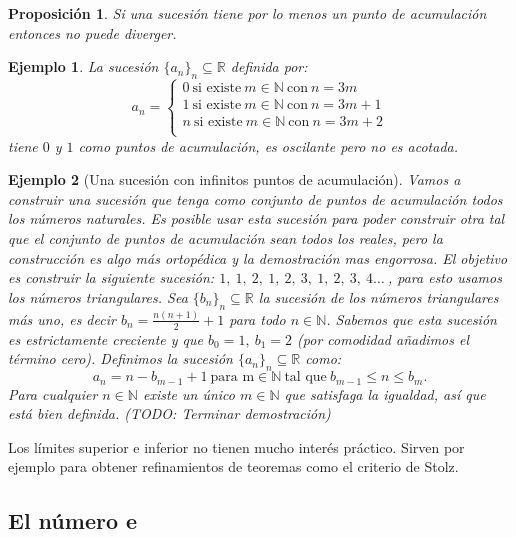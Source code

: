 \documentclass{article}
\newtheorem{prop}{Proposición}
\newtheorem{ejem}{Ejemplo}
\newcommand{\reales}{\mathbb{R}}
\newcommand{\naturales}{\mathbb{N}}
\newcommand{\sucreal}[1]{\{ #1 _n \}_n \subseteq \reales}
\begin{document}
\begin{prop}
	Si una sucesión tiene por lo menos un punto de acumulación entonces no puede diverger.
\end{prop}

\begin{ejem}
	La sucesión $\sucreal{a}$ definida por:
	\begin{equation}
		a_n = \left\lbrace
		\begin{array}{l}
		0\ \text{si existe}\ m \in \naturales\ \text{con}\ n = 3m\\
		1\ \text{si existe}\ m \in \naturales\ \text{con}\ n = 3m + 1\\
		n\ \text{si existe}\ m \in \naturales\ \text{con}\ n = 3m + 2\\
		\end{array}
		\right.
	\end{equation}
	tiene $0$ y $1$ como puntos de acumulación, es oscilante pero no es acotada.
\end{ejem}

\begin{ejem}[Una sucesión con infinitos puntos de acumulación]
	Vamos a construir una sucesión que tenga como conjunto de puntos de acumulación todos los números naturales. Es posible usar esta sucesión para poder construir otra tal que el conjunto de puntos de acumulación sean todos los reales, pero la construcción es algo más ortopédica y la demostración mas engorrosa.
	El objetivo es construir la siguiente sucesión: $1,\ 1,\ 2,\ 1,\ 2,\ 3,\ 1,\ 2,\ 3,\ 4 \ldots\ $, para esto usamos los números triangulares.
	Sea $\sucreal{b}$ la sucesión de los números triangulares más uno, es decir $b_n = \frac{n(n+1)}{2} + 1$ para todo $n \in \naturales$. Sabemos que esta sucesión es estrictamente creciente y que $b_0 = 1,\ b_1 = 2$ (por comodidad añadimos el término cero). Definimos la sucesión $\sucreal{a}$ como:
	\begin{equation*}
		a_n = n - b_{m-1} + 1\ \text{para m} \in \naturales\ \text{tal que}\ b_{m-1} \leq n \leq b_m \text{.}
	\end{equation*}
	Para cualquier $n \in \naturales$ existe un único $m \in \naturales$ que satisfaga la igualdad, así que está bien definida. (TODO: Terminar demostración)
\end{ejem}

Los límites superior e inferior no tienen mucho interés práctico. Sirven por ejemplo para obtener refinamientos de teoremas como el criterio de Stolz.

\subsection{El número e}
\end{document}
